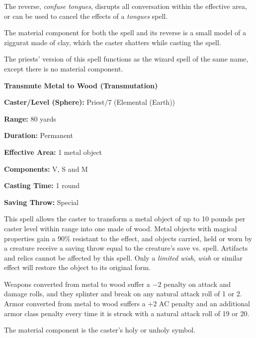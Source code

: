 \begin{multicols}{2}
The reverse, \textit{confuse tongues}, disrupts all conversation within the effective area, or can be used to cancel the effects of a \textit{tongues} spell.

The material component for both the spell and its reverse is a small model of a ziggurat made of clay, which the caster shatters while casting the spell.

The priests' version of this spell functions as the wizard spell of the same name, except there is no material component.

 
\vspace{1em}

\noindent
\begin{minipage}{\columnwidth}

\noindent \textbf{Transmute Metal to Wood (Transmutation)}

\noindent \textbf{Caster/Level (Sphere):} Priest/7 (Elemental (Earth))

\noindent \textbf{Range:} 80 yards

\noindent \textbf{Duration:} Permanent

\noindent \textbf{Effective Area:} 1 metal object

\noindent \textbf{Components:} V, S and M

\noindent \textbf{Casting Time:} 1 round

\noindent \textbf{Saving Throw:} Special

\end{minipage}

This spell allows the caster to transform a metal object of up to 10 pounds per caster level within range into one made of wood.  Metal objects with magical properties gain a 90\% resistant to the effect, and objects carried, held or worn by a creature receive a saving throw equal to the creature's save vs. spell.  Artifacts and relics cannot be affected by this spell.  Only a \textit{limited wish}, \textit{wish} or similar effect will restore the object to its original form.  

Weapons converted from metal to wood suffer a $-2$ penalty on attack and damage rolls, and they splinter and break on any natural attack roll of 1 or 2.  Armor converted from metal to wood suffers a +2 AC penalty and an additional armor class penalty every time it is struck with a natural attack roll of 19 or 20.

The material component is the caster's holy or unholy symbol.

\vspace{1em}


\end{multicols}
